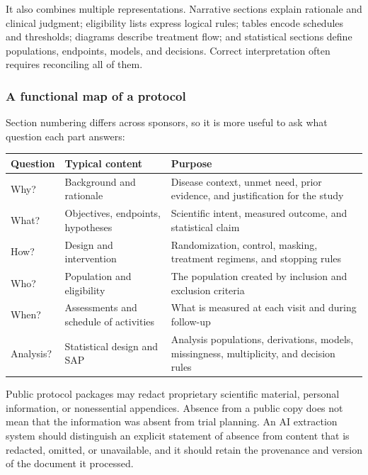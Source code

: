 \documentclass[12pt,oneside]{book}
\numberwithin{equation}{section}
\theoremstyle{definition}
\theoremstyle{plain}
\theoremstyle{remark}
\begin{document}
It also combines multiple representations.  Narrative sections explain
rationale and clinical judgment; eligibility lists express logical rules;
tables encode schedules and thresholds; diagrams describe treatment flow; and
statistical sections define populations, endpoints, models, and decisions.
Correct interpretation often requires reconciling all of them.

\subsubsection{A functional map of a protocol}

Section numbering differs across sponsors, so it is more useful to ask what
question each part answers:
\begin{center}
\begin{tabular}{>{\raggedright\arraybackslash}p{}
                >{\raggedright\arraybackslash}p{}
                >{\raggedright\arraybackslash}p{}}
\toprule
\textbf{Question} & \textbf{Typical content} & \textbf{Purpose}\\
\midrule
Why? & Background and rationale & Disease context, unmet need, prior evidence,
and justification for the study\\
What? & Objectives, endpoints, hypotheses & Scientific intent, measured outcome,
and statistical claim\\
How? & Design and intervention & Randomization, control, masking, treatment
regimens, and stopping rules\\
Who? & Population and eligibility & The population created by inclusion and
exclusion criteria\\
When? & Assessments and schedule of activities & What is measured at each
visit and during follow-up\\
Analysis? & Statistical design and SAP & Analysis populations,
derivations, models, missingness, multiplicity, and decision rules\\
\bottomrule
\end{tabular}
\end{center}

Public protocol packages may redact proprietary scientific material, personal
information, or nonessential appendices.  Absence from a public copy does not
mean that the information was absent from trial planning.  An AI extraction
system should distinguish an explicit statement of absence from content that
is redacted, omitted, or unavailable, and it should retain the provenance and
version of the document it processed.
\end{document}
